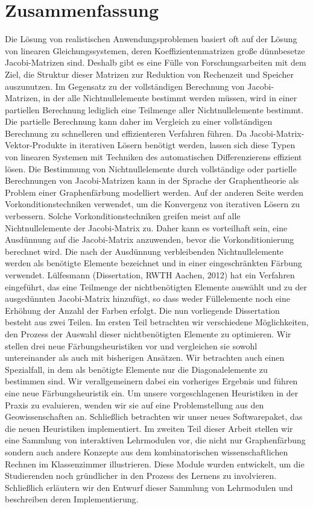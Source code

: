 \documentclass[12pt, twoside,a4paper,toc=bibliography]{scrbook}
\begin{document}
\chapter*{Zusammenfassung}
Die Lösung von realistischen Anwendungsproblemen basiert oft auf der Lösung von linearen
Glei\-chungs\-systemen, deren Koeffizientenmatrizen  große dünnbesetze Jacobi-Matrizen sind.
Deshalb gibt es eine Fülle von Forschungsarbeiten mit dem Ziel, die Struktur dieser Matrizen zur
Reduktion von Rechenzeit und Speicher auszunutzen. Im Gegensatz zu der voll\-ständigen
Berechnung von Jacobi-Matrizen, in der alle Nicht\-null\-elemente be\-stimmt werden müssen,
wird in einer partiellen Berechnung lediglich eine Teilmenge aller Nichtnullelemente be\-stimmt.
Die partielle Be\-rechnung kann daher im Vergleich zu einer vollständigen Berechnung zu
schnelleren und effizienteren Verfahren führen. Da Jacobi-Matrix-Vektor-Produkte in iterativen
Lösern benötigt werden, lassen sich diese Typen von linearen Systemen mit Techniken des
automatischen Differenzierens effizient lösen. Die Be\-stimmung von Nicht\-null\-elemente durch
vollständige oder partielle Berechnungen von Jacobi-Matrizen kann in der Sprache der
Graphen\-theorie als Problem einer Graphen\-färbung modelliert werden.
%
Auf der anderen Seite werden Vor\-konditions\-techniken verwendet, um die Konvergenz von
iterativen Lösern zu verbessern. Solche Vor\-konditions\-techniken greifen meist auf alle
Nichtnullelemente der Jacobi-Matrix zu. Daher kann es vorteilhaft sein, eine Ausdünnung auf die
Jacobi-Matrix anzuwenden, bevor die Vor\-kon\-ditio\-nie\-rung berechnet wird. Die nach der
Ausdünnung verbleibenden Nicht\-null\-elemente werden als benötigte Elemente bezeichnet und
in einer eingeschränkten Färbung verwendet. Lülfesmann (Dissertation, RWTH Aachen, 2012) hat
ein Verfahren eingeführt, das eine Teilmenge der nichtbenötigten Elemente auswählt und zu der
ausgedünnten Jacobi-Matrix hinzufügt, so dass weder Füllelemente noch eine Erhöhung der Anzahl
der Farben erfolgt. Die nun vorliegende Dissertation besteht aus zwei Teilen. Im ersten Teil
be\-trachten wir verschiedene Möglichkeiten, den Prozess der Auswahl dieser nichtbenötigten
Elemente zu optimieren. Wir stellen drei neue Färbungsheuristiken vor und vergleichen sie sowohl
untereinander als auch mit bisherigen Ansätzen. Wir be\-trachten auch einen Spezialfall, in dem als
benötigte Elemente  nur die Diagonalelemente zu be\-stimmen sind. Wir verallgemeinern dabei ein
vorheriges Ergebnis und führen eine neue Färbungsheuristik ein. Um unsere vorgeschlagenen
Heuristiken in der Praxis zu evaluieren, wenden wir sie auf eine Problemstellung aus den
Geo\-wissen\-schaften an. Schließlich be\-trachten wir unser neues Softwarepaket, das die neuen
Heuristiken implementiert. Im zweiten Teil dieser Arbeit stellen wir eine Sammlung von interaktiven
Lehrmodulen vor, die nicht nur Graphenfärbung sondern auch andere Konzepte aus dem
kombinatorischen wissen\-schaftlichen Rechnen im Klassenzimmer illustrieren. Diese Module
wurden ent\-wickelt, um die Studierenden noch gründlicher in den Prozess des Lernens zu
involvieren. Schließlich erläutern wir den Ent\-wurf dieser Sammlung von Lehrmodulen und
beschreiben deren Implementierung.
\end{document}
